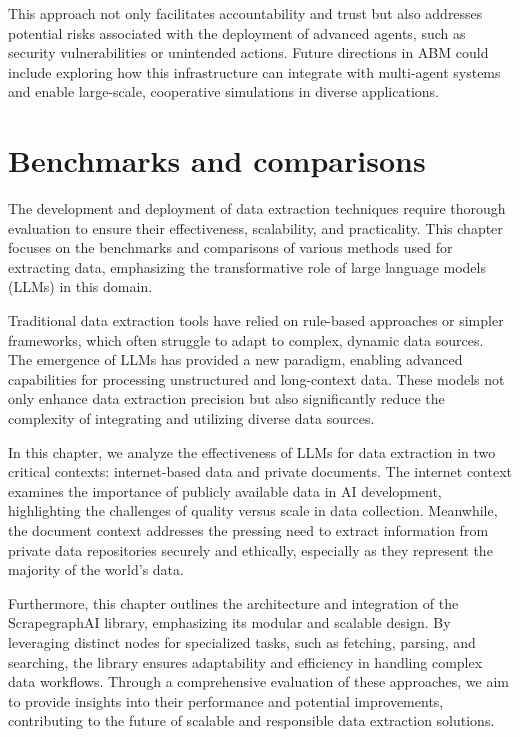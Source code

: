 This approach not only facilitates accountability and trust but also addresses potential risks associated with the deployment of advanced agents, such as security vulnerabilities or unintended actions. Future directions in ABM could include exploring how this infrastructure can integrate with multi-agent systems and enable large-scale, cooperative simulations in diverse applications.



\chapter{Benchmarks and comparisons}

The development and deployment of data extraction techniques require thorough evaluation to ensure their effectiveness, scalability, and practicality. This chapter focuses on the benchmarks and comparisons of various methods used for extracting data, emphasizing the transformative role of large language models (LLMs) in this domain.

Traditional data extraction tools have relied on rule-based approaches or simpler frameworks, which often struggle to adapt to complex, dynamic data sources. The emergence of LLMs has provided a new paradigm, enabling advanced capabilities for processing unstructured and long-context data. These models not only enhance data extraction precision but also significantly reduce the complexity of integrating and utilizing diverse data sources.

In this chapter, we analyze the effectiveness of LLMs for data extraction in two critical contexts: internet-based data and private documents. The internet context examines the importance of publicly available data in AI development, highlighting the challenges of quality versus scale in data collection. Meanwhile, the document context addresses the pressing need to extract information from private data repositories securely and ethically, especially as they represent the majority of the world's data.

Furthermore, this chapter outlines the architecture and integration of the ScrapegraphAI library, emphasizing its modular and scalable design. By leveraging distinct nodes for specialized tasks, such as fetching, parsing, and searching, the library ensures adaptability and efficiency in handling complex data workflows. Through a comprehensive evaluation of these approaches, we aim to provide insights into their performance and potential improvements, contributing to the future of scalable and responsible data extraction solutions.
